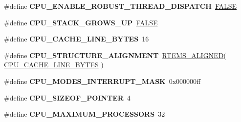 \begin{DoxyCompactItemize}
\item 
\mbox{\label{group__RTEMSScoreCPUMIPS_ga0c634f4a6bc9236bcacafc9b6119e011}} 
\#define {\bfseries C\+P\+U\+\_\+\+E\+N\+A\+B\+L\+E\+\_\+\+R\+O\+B\+U\+S\+T\+\_\+\+T\+H\+R\+E\+A\+D\+\_\+\+D\+I\+S\+P\+A\+T\+CH}~\mbox{\hyperlink{group__RTEMSScoreBaseDefs_gaa93f0eb578d23995850d61f7d61c55c1}{F\+A\+L\+SE}}
\item 
\mbox{\label{group__RTEMSScoreCPUMIPS_gac40d98a563f63934a5775f1366ba1b67}} 
\#define {\bfseries C\+P\+U\+\_\+\+S\+T\+A\+C\+K\+\_\+\+G\+R\+O\+W\+S\+\_\+\+UP}~\mbox{\hyperlink{group__RTEMSScoreBaseDefs_gaa93f0eb578d23995850d61f7d61c55c1}{F\+A\+L\+SE}}
\item 
\mbox{\label{group__RTEMSScoreCPUMIPS_gaafa1399e268a9ae6adf6d6aad4371688}} 
\#define {\bfseries C\+P\+U\+\_\+\+C\+A\+C\+H\+E\+\_\+\+L\+I\+N\+E\+\_\+\+B\+Y\+T\+ES}~16
\item 
\mbox{\label{group__RTEMSScoreCPUMIPS_gacd43704c7821a2c042d212801156584e}} 
\#define {\bfseries C\+P\+U\+\_\+\+S\+T\+R\+U\+C\+T\+U\+R\+E\+\_\+\+A\+L\+I\+G\+N\+M\+E\+NT}~\mbox{\hyperlink{structRTEMS__ALIGNED}{R\+T\+E\+M\+S\+\_\+\+A\+L\+I\+G\+N\+ED}}( \mbox{\hyperlink{no__cpu_2include_2rtems_2score_2cpu_8h_aafa1399e268a9ae6adf6d6aad4371688}{C\+P\+U\+\_\+\+C\+A\+C\+H\+E\+\_\+\+L\+I\+N\+E\+\_\+\+B\+Y\+T\+ES}} )
\item 
\mbox{\label{group__RTEMSScoreCPUMIPS_gaf8823e651e33b9683e0d89e5a8054ee6}} 
\#define {\bfseries C\+P\+U\+\_\+\+M\+O\+D\+E\+S\+\_\+\+I\+N\+T\+E\+R\+R\+U\+P\+T\+\_\+\+M\+A\+SK}~0x000000ff
\item 
\mbox{\label{group__RTEMSScoreCPUMIPS_gaea4bd2905092d69bc92fbff6103ced8b}} 
\#define {\bfseries C\+P\+U\+\_\+\+S\+I\+Z\+E\+O\+F\+\_\+\+P\+O\+I\+N\+T\+ER}~4
\item 
\mbox{\label{group__RTEMSScoreCPUMIPS_gadea68a7fa02909edcebee08748f94223}} 
\#define {\bfseries C\+P\+U\+\_\+\+M\+A\+X\+I\+M\+U\+M\+\_\+\+P\+R\+O\+C\+E\+S\+S\+O\+RS}~32
\item 
\mbox{\label{group__RTEMSScoreCPUMIPS_ga896055157b72692a6141f7c0039eabdf}} 

\end{DoxyCompactItemize}
